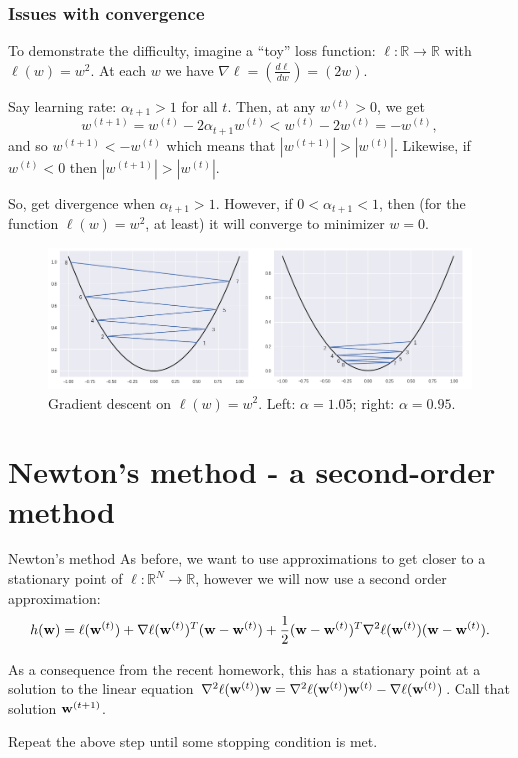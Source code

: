 \documentclass{beamer}
\theoremstyle{example}
\begin{document}
\begin{frame}
    \frametitle{Issues with convergence}
    To demonstrate the difficulty, imagine a ``toy'' loss function: $\ell:\mathbb R\to\mathbb R$ with $\ell(w) = w^2$. At each $w$ we have $\nabla\ell = \left(\frac{d\ell}{dw}\right) = (2w)$. 

    \pause
    Say learning rate: $\alpha_{t+1} > 1$ for all $t$. Then, at any $w^{(t)} > 0$, we get 
        \[w^{(t+1)} = w^{(t)} - 2\alpha_{t+1} w^{(t)} < w^{(t)} - 2w^{(t)} = -w^{(t)},\]
    and so $w^{(t+1)}<-w^{(t)}$ which means that $|w^{(t+1)}| > |w^{(t)}|$. \pause Likewise, if $w^{(t)} < 0$ then $|w^{(t+1)}| > |w^{(t)}|$.
    
    \pause
    So, get divergence when $\alpha_{t+1} > 1$. However, if $0< \alpha_{t+1} < 1$, then (for the function $\ell(w)=w^2$, at least) it will converge to minimizer $w=0$.

    \pause
    \begin{figure}
    \includegraphics[height=0.3\textheight]{../../Images/GD-choosing-lr.png}
    \caption{Gradient descent on $\ell(w) = w^2$. Left: $\alpha = 1.05$; right: $\alpha = 0.95$.}
    \end{figure}
\end{frame}

\section{Newton's method - a second-order method}

\begin{frame}{Newton's method}
    As before, we want to use approximations to get closer to a stationary point of $\ell:\mathbb R^N\to\mathbb R$, however we will now use a second order approximation:
    \[h({\bf w}) = \ell({\bf w}^{(t)}) + \nabla\ell({\bf w}^{(t)})^T({\bf w} - {\bf w}^{(t)}) 
    + \frac12({\bf w} - {\bf w}^{(t)})^T\nabla^2\ell({\bf w}^{(t)})({\bf w}-{\bf w}^{(t)}).\]

    \pause 
    As a consequence from the recent homework, this has a stationary point at a solution to the linear equation $\nabla^2\ell({\bf w}^{(t)}){\bf w} = \nabla^2\ell({\bf w}^{(t)}){\bf w}^{(t)} - \nabla\ell({\bf w}^{(t)})$. Call that solution ${\bf w}^{(t+1)}$.

    Repeat the above step until some stopping condition is met.
\end{frame}
\end{document}
